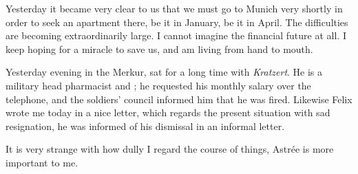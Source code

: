 
\missing

Yesterday it became very clear to us that we must go to Munich very shortly in order to seek an apartment there, be it in January, be it in April. The difficulties are becoming extraordinarily large. I cannot imagine the financial future at all. I keep hoping for a miracle to save us, and am living from hand to mouth.

\missing

Yesterday evening in the Merkur, sat for a long time with \textit{Kratzert}. He is a military head pharmacist and ; he requested his monthly salary over the telephone, and the soldiers' council informed him that he was fired. Likewise Felix wrote me today in a nice letter, which regards the present situation with sad resignation, he was informed of his dismissal in an informal letter.

It is very strange with how dully I regard the course of things, Astrée is more important to me.

